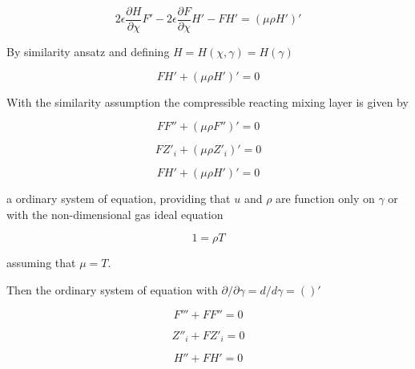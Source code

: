 \begin{equation} 
2\epsilon
\frac{\partial H}{\partial \chi}
F'
-
2\epsilon
\frac{\partial F}{\partial \chi}
H'
-
F
H'
=
\left(\mu\rho  
H'
\right)'
\end{equation} 

By similarity ansatz and defining $H=H(\chi,\gamma)=H(\gamma)$

\begin{equation} 
F
H'
+
\left(\mu\rho  
H'
\right)'
=0
\end{equation} 

With the similarity assumption the compressible reacting mixing
layer is given by 

\begin{equation*} 
F
F''
+
\left(
    \mu\rho
    F''
\right)'
=0
\end{equation*} 

\begin{equation*} 
F
Z'_i
+
\left(\mu\rho  
Z'_i
\right)'=0
\end{equation*} 

\begin{equation*} 
F
H'
+
\left(\mu\rho  
H'
\right)'
=0
\end{equation*} 


a ordinary system of equation, providing that 
$u$ and $\rho$ are function only on $\gamma$ or 
with the non-dimensional gas ideal equation

\begin{equation}
1=\rho T
\end{equation}

assuming that $\mu=T$.

Then the ordinary system of equation with 
$\partial /\partial  \gamma=d/d \gamma=()'$ 

\begin{equation*} 
F'''
+
F
F''
=0
\end{equation*} 

\begin{equation*} 
Z''_i
+
F
Z'_i
=0
\end{equation*} 

\begin{equation*} 
H''
+
F
H'
=0
\end{equation*} 